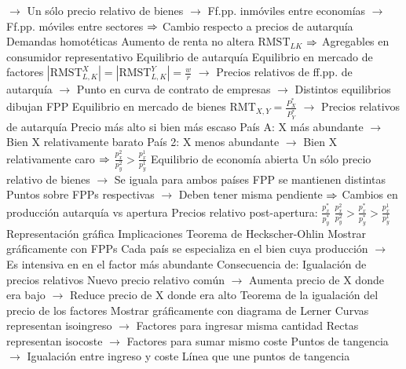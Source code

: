 \documentclass{nuevotema}
\begin{document}
\begin{esquemal}
				\4[] $\to$ Un sólo precio relativo de bienes
				\4[] $\to$ Ff.pp. inmóviles entre economías
				\4[] $\to$ Ff.pp. móviles entre sectores
				\4[] $\Rightarrow$ Cambio respecto a precios de autarquía
				\4 Demandas homotéticas
				\4[] Aumento de renta no altera $\text{RMST}_{LK}$
				\4[] $\Rightarrow$ Agregables en consumidor representativo
			\3 Equilibrio de autarquía
				\4 Equilibrio en mercado de factores
				\4[] $\left| \text{RMST}^X_{L,K} \right| = \left| \text{RMST}^Y_{L,K} \right| = \frac{w}{r}$
				\4[] $\to$ Precios relativos de ff.pp. de autarquía
				\4[] $\to$ Punto en curva de contrato de empresas
				\4[] $\to$ Distintos equilibrios dibujan FPP
				\4 Equilibrio en mercado de bienes
				\4[] $\text{RMT}_{X,Y} = \frac{P_X^*}{P_Y^*}$
				\4[] 
				\4[] $\to$ Precios relativos de autarquía
				\4[] Precio más alto si bien más escaso
				\4[] País A: X más abundante
				\4[] $\to$ Bien X relativamente barato
				\4[] País 2: X menos abundante
				\4[] $\to$ Bien X relativamente caro
				\4[] $\Rightarrow$ $\frac{p_x^2}{p_y^2} > \frac{p_x^1}{p_y^1} $
				\4[] 
			\3 Equilibrio de economía abierta
				\4 Un sólo precio relativo de bienes
				\4[] $\to$ Se iguala para ambos países
				\4 FPP se mantienen distintas
				\4[] Puntos sobre FPPs respectivas
				\4[] $\to$ Deben tener misma pendiente
				\4[] $\Rightarrow$ Cambios en producción autarquía vs apertura
				\4 Precios relativo post-apertura: $\frac{p_x^*}{p_y^*}$
				\4[] $\frac{p_x^2}{p_y^2} > \frac{p_x^*}{p_y^*} > \frac{p_x^1}{p_y^1} $
				\4 Representación gráfica
				\4[] 
		\2 Implicaciones
			\3 Teorema de Heckscher-Ohlin
				\4 
				\4[] Mostrar gráficamente con FPPs
				\4[] 
				\4[] Cada país se especializa en el bien cuya producción
				\4[] $\to$ Es intensiva en en el factor más abundante
				\4 Consecuencia de:
				\4[] Igualación de precios relativos
				\4[] Nuevo precio relativo común
				\4[] $\to$ Aumenta precio de X donde era bajo
				\4[] $\to$ Reduce precio de X donde era alto
			\3 Teorema de la igualación del precio de los factores
				\4 
				\4[] Mostrar gráficamente con diagrama de Lerner
				\4[] 
				\4[] Curvas representan isoingreso
				\4[] $\to$ Factores para ingresar misma cantidad
				\4[] Rectas representan isocoste
				\4[] $\to$ Factores para sumar mismo coste
				\4[] Puntos de tangencia
				\4[] $\to$ Igualación entre ingreso y coste
				\4[] Línea que une puntos de tangencia

\end{esquemal}
\end{document}
